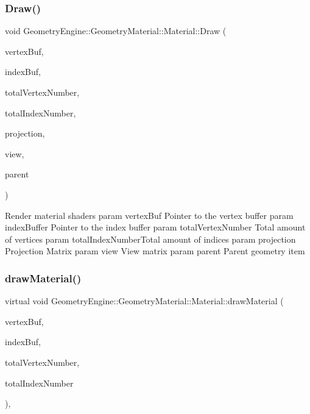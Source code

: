\subsubsection{\texorpdfstring{Draw()}{Draw()}}
{\footnotesize\ttfamily void Geometry\+Engine\+::\+Geometry\+Material\+::\+Material\+::\+Draw (\begin{DoxyParamCaption}\item[{Q\+Open\+G\+L\+Buffer $\ast$}]{vertex\+Buf,  }\item[{Q\+Open\+G\+L\+Buffer $\ast$}]{index\+Buf,  }\item[{unsigned int}]{total\+Vertex\+Number,  }\item[{unsigned int}]{total\+Index\+Number,  }\item[{const Q\+Matrix4x4 \&}]{projection,  }\item[{const Q\+Matrix4x4 \&}]{view,  }\item[{const \mbox{\hyperlink{class_geometry_engine_1_1_geometry_world_item_1_1_geometry_item_1_1_geometry_item}{Geometry\+World\+Item\+::\+Geometry\+Item\+::\+Geometry\+Item}} \&}]{parent }\end{DoxyParamCaption})\hspace{0.3cm}{\ttfamily [virtual]}}

Render material shaders param vertex\+Buf Pointer to the vertex buffer param index\+Buffer Pointer to the index buffer param total\+Vertex\+Number Total amount of vertices param total\+Index\+Number\+Total amount of indices param projection Projection Matrix param view View matrix param parent Parent geometry item \mbox{\label{class_geometry_engine_1_1_geometry_material_1_1_material_a0070eab6e5fe86dc05dc69f2e37b9072}} 
\subsubsection{\texorpdfstring{drawMaterial()}{drawMaterial()}}
{\footnotesize\ttfamily virtual void Geometry\+Engine\+::\+Geometry\+Material\+::\+Material\+::draw\+Material (\begin{DoxyParamCaption}\item[{Q\+Open\+G\+L\+Buffer $\ast$}]{vertex\+Buf,  }\item[{Q\+Open\+G\+L\+Buffer $\ast$}]{index\+Buf,  }\item[{unsigned int}]{total\+Vertex\+Number,  }\item[{unsigned int}]{total\+Index\+Number }\end{DoxyParamCaption})\hspace{0.3cm}{\ttfamily [protected]}, {}}

